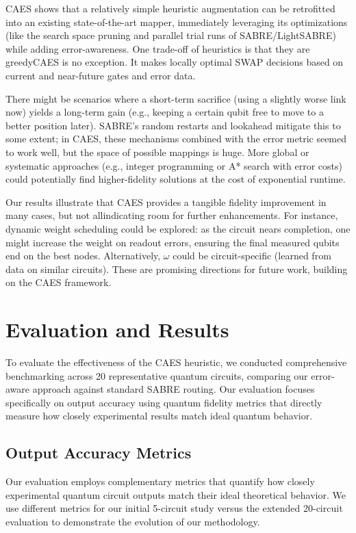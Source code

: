 \documentclass[conference]{IEEEtran}
\begin{document}
CAES shows that a relatively simple heuristic augmentation can be retrofitted into an existing state-of-the-art mapper, immediately leveraging its optimizations (like the search space pruning and parallel trial runs of SABRE/LightSABRE) while adding error-awareness. One trade-off of heuristics is that they are greedy\textemdash CAES is no exception. It makes locally optimal SWAP decisions based on current and near-future gates and error data.

There might be scenarios where a short-term sacrifice (using a slightly worse link now) yields a long-term gain (e.g., keeping a certain qubit free to move to a better position later). SABRE’s random restarts and lookahead mitigate this to some extent; in CAES, these mechanisms combined with the error metric seemed to work well, but the space of possible mappings is huge. More global or systematic approaches (e.g., integer programming or A* search with error costs) could potentially find higher-fidelity solutions at the cost of exponential runtime.

Our results illustrate that CAES provides a tangible fidelity improvement in many cases, but not all\textemdash indicating room for further enhancements. For instance, dynamic weight scheduling could be explored: as the circuit nears completion, one might increase the weight on readout errors, ensuring the final measured qubits end on the best nodes. Alternatively, $\omega$ could be circuit-specific (learned from data on similar circuits). These are promising directions for future work, building on the CAES framework.


\section{Evaluation and Results}

To evaluate the effectiveness of the CAES heuristic, we conducted comprehensive benchmarking across 20 representative quantum circuits, comparing our error-aware approach against standard SABRE routing. Our evaluation focuses specifically on output accuracy using quantum fidelity metrics that directly measure how closely experimental results match ideal quantum behavior.

\subsection{Output Accuracy Metrics}

Our evaluation employs complementary metrics that quantify how closely experimental quantum circuit outputs match their ideal theoretical behavior. We use different metrics for our initial 5-circuit study versus the extended 20-circuit evaluation to demonstrate the evolution of our methodology.
\end{document}
